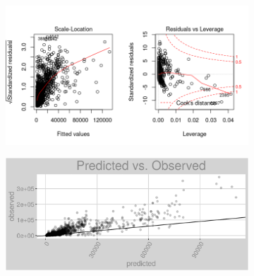 \begin{figure}[h]
\centering
\begin{subfigure}{1\textwidth}
\centering
\includegraphics[width=.99\textwidth, height=0.475\textheight]{Images/electricity_rf_res_2.png}
\end{subfigure}
\begin{subfigure}{1\textwidth}
\centering
\includegraphics[width=.99\textwidth, height=0.3\textheight]{Images/electricity_rf_pvo.png}
\end{subfigure}
\end{figure}
\FloatBarrier
\newpage
